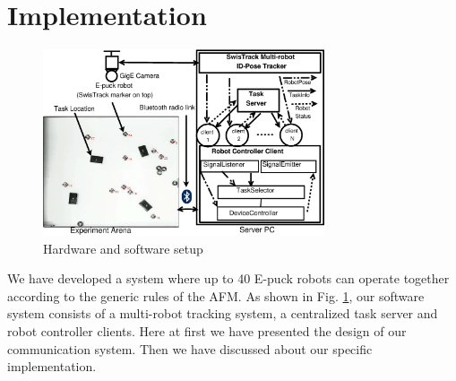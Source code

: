 \documentclass[letterpaper, 10 pt, conference]{ieeeconf}  %
\begin{document}
\section{Implementation}
\label{sec:impl}
\begin{figure}
\centering
\includegraphics[height=5.5cm, angle=0]
{../dia-files/RIL-Expt-Setup1.eps}
\caption{\small Hardware and software setup}
\label{fig:setup} %
\end{figure}
We have developed a system where up to 40 E-puck robots \cite{Epuck} can operate together according to the generic rules of the AFM. As shown in Fig. \ref{fig:setup}, our software system consists of a multi-robot tracking system, a centralized task server and robot controller clients. Here at first we have presented the design of our communication system. Then we have discussed about our specific implementation. 

\end{document}
